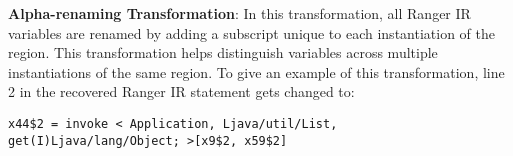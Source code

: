 \textbf{Alpha-renaming Transformation}: In this transformation, all Ranger IR variables are renamed by adding a subscript
unique to each instantiation of the region.
%
This transformation helps distinguish variables across multiple instantiations of the same region.
%
%
To give an example of this transformation, line 2 in the recovered Ranger IR statement gets changed to:
\begin{lstlisting}
x44$2 = invoke < Application, Ljava/util/List, get(I)Ljava/lang/Object; >[x9$2, x59$2]
\end{lstlisting}

